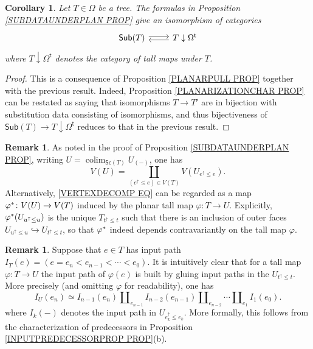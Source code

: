 \documentclass[a4paper,10pt
,draft
]{article}%
\numberwithin{equation}{section}
\numberwithin{figure}{section}
\newtheorem{corollary}[equation]{Corollary}%
\theoremstyle{definition} %
\newtheorem{remark}[equation]{Remark}%
\DeclareMathOperator{\colim}{colim}%
\newcommand{\1}{\ensuremath{\mathbbm 1}}%
\begin{document}
\begin{corollary}\label{SUBDATAUNDERPLAN COR}
Let $T \in \Omega$ be a tree. The formulas in
Proposition \ref{SUBDATAUNDERPLAN PROP}
give an isomorphism of categories
\[
\begin{tikzcd}[row sep =0pt]
	\mathsf{Sub}(T) \ar[r,shift left=2pt] &
	T \downarrow \Omega^{\mathsf{t}} \ar[l,shift left=2pt]
\end{tikzcd}
\]
where $T \downarrow \Omega^{\mathsf{t}}$ denotes
the category of tall maps under $T$.
\end{corollary}


\begin{proof}
	This is a consequence of Proposition \ref{PLANARPULL PROP} together with the previous result.
	Indeed, Proposition \ref{PLANARIZATIONCHAR PROP} can be restated as saying that isomorphisms $T \to T'$ are in bijection with substitution data consisting of isomorphisms, and thus  bijectiveness of $\mathsf{Sub}(T) \to T \downarrow \Omega^{\mathsf{t}}$ reduces to that in the previous result.
\end{proof}

\begin{remark}\label{VERTEXDECOMP REM}
As noted in the proof of Proposition \ref{SUBDATAUNDERPLAN PROP}, writing $U = \colim_{\mathsf{Sc}(T)}U_{(\minus)}$,
	one has 
\begin{equation}\label{VERTEXDECOMP EQ}
	V(U) = \coprod_{(e^{\uparrow} \leq e) \in V(T)}
	V(U_{e^{\uparrow} \leq e}).
  \end{equation}
    Alternatively, \eqref{VERTEXDECOMP EQ} can be regarded as a map 
    $\varphi^{\**} \colon V(U) \to V(T)$ induced by the planar tall map 
    $\varphi \colon T \to U$.
    Explicitly, $\varphi^{\**}(U_{u^{\uparrow} \leq u})$ 
    is the unique $T_{t^{\uparrow}\leq t}$ such that
    there is an inclusion of outer faces $U_{u^{\uparrow} \leq u} \hookrightarrow U_{t^{\uparrow} \leq t}$,
    so that $\varphi^{\**}$ indeed depends contravariantly on the tall map $\varphi$.
\end{remark}

\begin{remark}\label{INPPATH REM}
Suppose that $e \in T$ has input path
$I_T(e) = (e=e_n < e_{n-1} < \cdots < e_0)$.
It is intuitively clear that for a tall map 
$\varphi \colon T \to U$ the input path of $\varphi(e)$ is built by gluing input paths in the $U_{t^{\uparrow} \leq t}$. More precisely (and omitting $\varphi$ for readability), one has
\[
	I_U\left(e_n \right) \simeq 
	I_{n-1}(e_n) \amalg_{e_{n-1}} I_{n-2}(e_{n-1})
	\amalg_{e_{n-2}} \cdots
	\amalg_{e_1} I_1(e_0).
\]
where $I_k(\minus)$ denotes the input path in $U_{e_k^{\uparrow} \leq e_k}$.
More formally, this follows from the characterization of 
predecessors in Proposition \ref{INPUTPREDECESSORPROP PROP}(b).
\end{remark}
\end{document}
